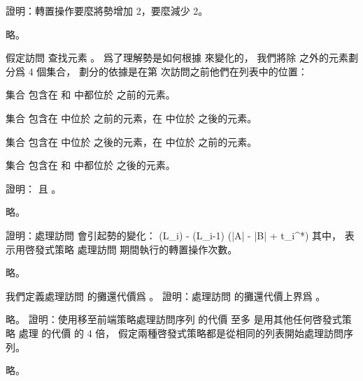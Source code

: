 \startigBase[continue]\startitem
證明：轉置操作要麼將勢增加 2，要麼減少 2。
\stopitem\stopigBase

\startANSWER
略。
\stopANSWER

假定訪問  查找元素 。
爲了理解勢是如何根據  來變化的，
我們將除  之外的元素劃分爲 4 個集合，
劃分的依據是在第  次訪問之前他們在列表中的位置：

集合  包含在  和  中都位於  之前的元素。

集合  包含在  中位於  之前的元素，在  中位於  之後的元素。

集合  包含在  中位於  之後的元素，在  中位於  之前的元素。

集合  包含在  和  中都位於  之後的元素。

\startigBase[continue]\startitem
證明：  且 。
\stopitem\stopigBase

\startANSWER
略。
\stopANSWER

\startigBase[continue]\startitem
證明：處理訪問  會引起勢的變化：
\startformula
\Phi(L_i) - \Phi(L_{i-1}) (|A| - |B| + t_i^*)
\stopformula
其中，  表示用啓發式策略  處理訪問  期間執行的轉置操作次數。
\stopitem\stopigBase

\startANSWER
略。
\stopANSWER

我們定義處理訪問  的攤還代價爲 。
\startigBase[continue]\startitem
證明：處理訪問  的攤還代價上界爲 。
\stopitem\stopigBase

\startANSWER
略。
\stopANSWER
\startigBase[continue]\startitem
證明：使用移至前端策略處理訪問序列 \m{\sigma} 的代價  至多
是用其他任何啓發式策略  處理 \m{\sigma} 的代價  的 4 倍，
假定兩種啓發式策略都是從相同的列表開始處理訪問序列。
\stopitem\stopigBase

\startANSWER
略。
\stopANSWER

\stopPROBLEM

\stopsubject%

